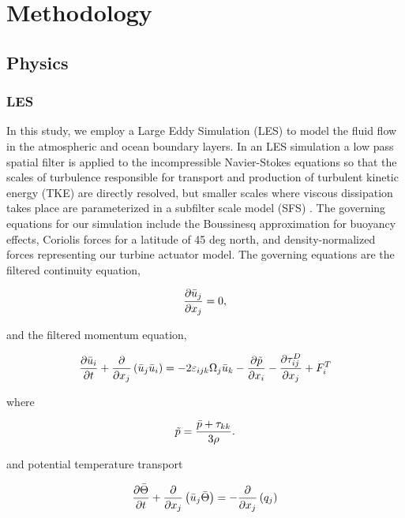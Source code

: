 \section{Methodology}

\subsection{Physics}


\subsubsection{LES}
In this study, we employ a Large Eddy Simulation (LES) to model the fluid flow in the atmospheric and ocean boundary layers.  In an LES simulation a low pass spatial filter is applied to the incompressible Navier-Stokes equations so that the scales of turbulence responsible for transport and production of turbulent kinetic energy (TKE) are directly resolved, but smaller scales where viscous dissipation takes place are parameterized in a subfilter scale model (SFS) \cite{moeng_large-eddy-simulation_1984}.  The governing equations for our simulation include the Boussinesq approximation for buoyancy effects, Coriolis forces for a latitude of 45 deg north, and density-normalized forces representing our turbine actuator model.  The governing equations are the filtered continuity equation,

\begin{equation}
   \label{filtered_continuity}
   \frac{\partial \bar{u}_j}{\partial x_j} = 0,
\end{equation}

and the filtered momentum equation,

\begin{equation}
   \label{filtered_momentum}
   \frac{\partial \bar{u}_i}{\partial t} + \frac{\partial}{\partial x_j}\left(\bar{u}_j \bar{u}_i \right)
   = -2\varepsilon_{ijk}\Omega_{j} \bar{u}_k -\frac{\partial \tilde{p}}{\partial x_i} - \frac{\partial \tau^D_{ij}}{\partial x_j} + F^T_i
\end{equation}

where

\begin{equation}
   \label{eq:modified_pressure}
   \tilde{p} = \frac{\bar{p} + \tau_{kk}}{3 \rho}.
\end{equation}

and potential temperature transport

\begin{equation}
   \label{potential temp}
   \frac{\partial \bar{\Theta}}{\partial t} + \frac{\partial}{\partial x_j}\left(\bar{u}_j \bar{\Theta} \right)
   = - \frac{\partial}{\partial x_j}\left( q_j\right) 
\end{equation}

